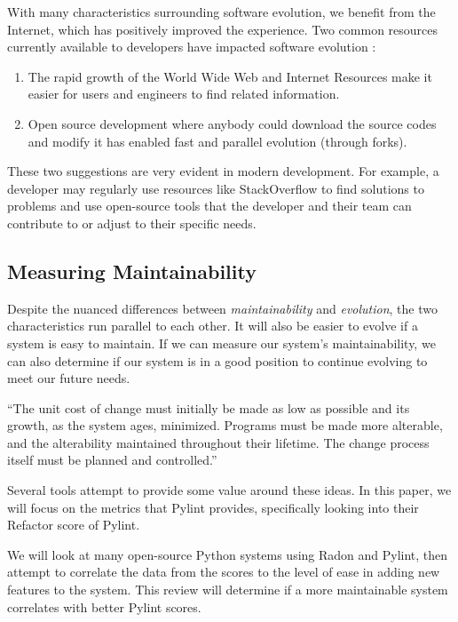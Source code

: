 With many characteristics surrounding software evolution, we benefit from the Internet, which has positively improved the experience. Two common resources currently available to developers have impacted software evolution \cite{wiki:software-evolution}:

\vspace{0.25cm}
\begin{enumerate}
    \item The rapid growth of the World Wide Web and Internet Resources make it easier for users and engineers to find related information.
    \item Open source development where anybody could download the source codes and modify it has enabled fast and parallel evolution (through forks).
\end{enumerate}
\vspace{0.25cm}

These two suggestions are very evident in modern development. For example, a developer may regularly use resources like StackOverflow to find solutions to problems and use open-source tools that the developer and their team can contribute to or adjust to their specific needs.

\subsection{Measuring Maintainability} \label{subMeasureMaintainability}

Despite the nuanced differences between \textit{maintainability} and \textit{evolution}, the two characteristics run parallel to each other. It will also be easier to evolve if a system is easy to maintain. If we can measure our system's maintainability, we can also determine if our system is in a good position to continue evolving to meet our future needs.

\vspace{0.25cm}
\begin{displayquote}
``The unit cost of change must initially be made as low as possible and its growth, as the system ages, minimized. Programs must be made more alterable, and the alterability maintained throughout their lifetime. The change process itself must be planned and controlled.'' \cite{lehman:1980}
\end{displayquote}
\vspace{0.25cm}

Several tools attempt to provide some value around these ideas. In this paper, we will focus on the metrics that Pylint provides, specifically looking into their Refactor score of Pylint.

We will look at many open-source Python systems using Radon and Pylint, then attempt to correlate the data from the scores to the level of ease in adding new features to the system. This review will determine if a more maintainable system correlates with better Pylint scores. 
